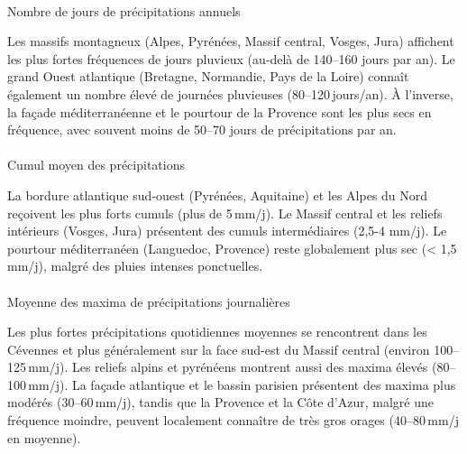 \documentclass[
  article,
  nofooter,
  noheadings]{jss}
\makeatletter
\let\oldparagraph\paragraph
\renewcommand{\paragraph}{
    \@ifstar
      \xxxParagraphStar
      \xxxParagraphNoStar
  }
\newcommand{\xxxParagraphStar}[1]{\oldparagraph*{#1}\mbox{}}
\newcommand{\xxxParagraphNoStar}[1]{\oldparagraph{#1}\mbox{}}
\makeatother
\begin{document}
\paragraph{Nombre de jours de précipitations
annuels}\label{nombre-de-jours-de-pruxe9cipitations-annuels}

Les massifs montagneux (Alpes, Pyrénées, Massif central, Vosges, Jura)
affichent les plus fortes fréquences de jours pluvieux (au‑delà de
140--160 jours par an). Le grand Ouest atlantique (Bretagne, Normandie,
Pays de la Loire) connaît également un nombre élevé de journées
pluvieuses (80--120\,jours/an). À l'inverse, la façade méditerranéenne
et le pourtour de la Provence sont les plus secs en fréquence, avec
souvent moins de 50--70 jours de précipitations par an.

\paragraph{Cumul moyen des
précipitations}\label{cumul-moyen-des-pruxe9cipitations}

La bordure atlantique sud‑ouest (Pyrénées, Aquitaine) et les Alpes du
Nord reçoivent les plus forts cumuls (plus de 5\,mm/j). Le Massif
central et les reliefs intérieurs (Vosges, Jura) présentent des cumuls
intermédiaires (2,5-4 mm/j). Le pourtour méditerranéen (Languedoc,
Provence) reste globalement plus sec (\textless{} 1,5 mm/j), malgré des
pluies intenses ponctuelles.

\paragraph{Moyenne des maxima de précipitations
journalières}\label{moyenne-des-maxima-de-pruxe9cipitations-journaliuxe8res}

Les plus fortes précipitations quotidiennes moyennes se rencontrent dans
les Cévennes et plus généralement sur la face sud-est du Massif central
(environ 100--125\,mm/j). Les reliefs alpins et pyrénéens montrent aussi
des maxima élevés (80--100\,mm/j). La façade atlantique et le bassin
parisien présentent des maxima plus modérés (30--60\,mm/j), tandis que
la Provence et la Côte d'Azur, malgré une fréquence moindre, peuvent
localement connaître de très gros orages (40--80\,mm/j en moyenne).
\end{document}
